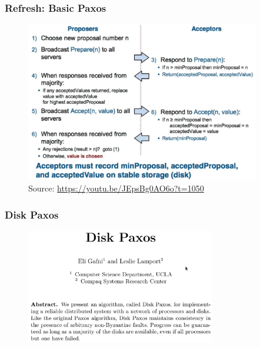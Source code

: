 \documentclass[10pt,utf8]{beamer}
\begin{document}
\begin{frame}
    \frametitle{Refresh: Basic Paxos}
    \begin{figure}
        \centering
        \includegraphics[height=7cm]{./img/basic-paxos.eps}
        \caption{\tiny{Source: \url{https://youtu.be/JEpsBg0AO6o?t=1050}}}
    \end{figure}
\end{frame}

\begin{frame}
    \frametitle{Disk Paxos}
    \begin{figure}
        \centering
        \includegraphics[height=5cm]{./img/disk-paxos-paper.eps}
    \end{figure}
\end{frame}
\end{document}
